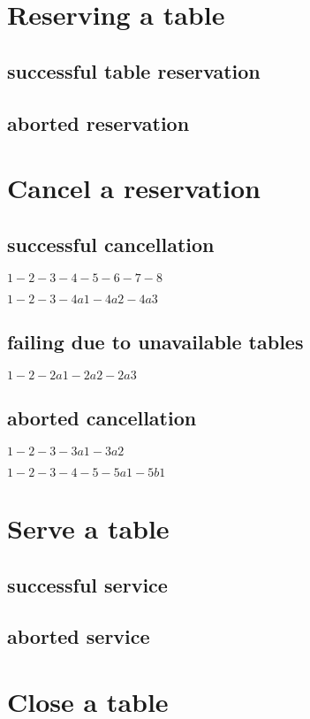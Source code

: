 \documentclass[a4paper,11pt,oneside]{book}
\begin{document}
\section{Reserving a table}

\subsection{successful table reservation}
\subsection{aborted reservation}

\section{Cancel a reservation}

\subsection{successful cancellation}
$1-2-3-4-5-6-7-8$

\noindent$1-2-3-4a1-4a2-4a3$
\subsection{failing due to unavailable tables}
$1-2-2a1-2a2-2a3$

\subsection{aborted cancellation}
$1-2-3-3a1-3a2$

\noindent$1-2-3-4-5-5a1-5b1$

\section{Serve a table}

\subsection{successful service}
\subsection{aborted service}

\section{Close a table}
\end{document}
